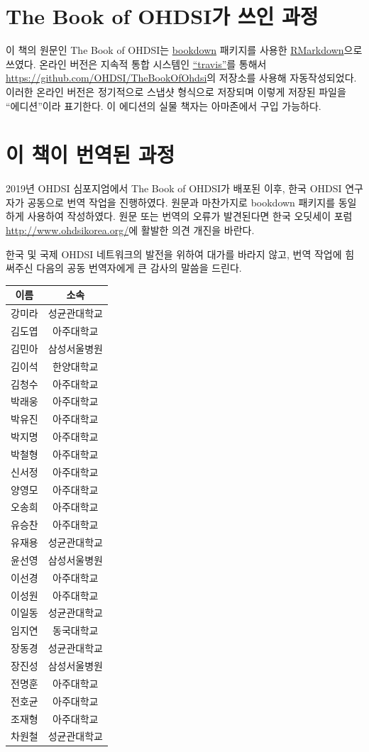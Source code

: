 \documentclass[10.5pt]{book}
\theoremstyle{definition}
\theoremstyle{definition}
\theoremstyle{definition}
\theoremstyle{remark}
\begin{document}
\section*{The Book of OHDSI가 쓰인 과정}\label{the-book-of-ohdsi--}

이 책의 원문인 The Book of OHDSI는 \href{https://bookdown.org}{bookdown}
패키지를 사용한 \href{https://rmarkdown.rstudio.com}{RMarkdown}으로
쓰였다. 온라인 버전은 지속적 통합 시스템인
\href{http://travis-ci.org/}{``travis''}를 통해서
\url{https://github.com/OHDSI/TheBookOfOhdsi}의 저장소를 사용해
자동작성되었다. 이러한 온라인 버전은 정기적으로 스냅샷 형식으로 저장되며
이렇게 저장된 파일을 ``에디션''이라 표기한다. 이 에디션의 실물 책자는
아마존에서 구입 가능하다.

\section*{이 책이 번역된 과정}\label{---}

2019년 OHDSI 심포지엄에서 The Book of OHDSI가 배포된 이후, 한국 OHDSI
연구자가 공동으로 번역 작업을 진행하였다. 원문과 마찬가지로 bookdown
패키지를 동일하게 사용하여 작성하였다. 원문 또는 번역의 오류가
발견된다면 한국 오딧세이 포럼 \url{http://www.ohdsikorea.org/}에 활발한
의견 개진을 바란다.

한국 및 국제 OHDSI 네트워크의 발전을 위하여 대가를 바라지 않고, 번역
작업에 힘써주신 다음의 공동 번역자에게 큰 감사의 말씀을 드린다.

\begin{longtable}[]{@{}cc@{}}
\toprule
이름 & 소속\tabularnewline
\midrule
\endhead
강미라 & 성균관대학교\tabularnewline
김도엽 & 아주대학교\tabularnewline
김민아 & 삼성서울병원\tabularnewline
김이석 & 한양대학교\tabularnewline
김청수 & 아주대학교\tabularnewline
박래웅 & 아주대학교\tabularnewline
박유진 & 아주대학교\tabularnewline
박지명 & 아주대학교\tabularnewline
박철형 & 아주대학교\tabularnewline
신서정 & 아주대학교\tabularnewline
양영모 & 아주대학교\tabularnewline
오송희 & 아주대학교\tabularnewline
유승찬 & 아주대학교\tabularnewline
유재용 & 성균관대학교\tabularnewline
윤선영 & 삼성서울병원\tabularnewline
이선경 & 아주대학교\tabularnewline
이성원 & 아주대학교\tabularnewline
이일동 & 성균관대학교\tabularnewline
임지연 & 동국대학교\tabularnewline
장동경 & 성균관대학교\tabularnewline
장진성 & 삼성서울병원\tabularnewline
전명훈 & 아주대학교\tabularnewline
전호균 & 아주대학교\tabularnewline
조재형 & 아주대학교\tabularnewline
차원철 & 성균관대학교\tabularnewline
\bottomrule
\end{longtable}
\end{document}
